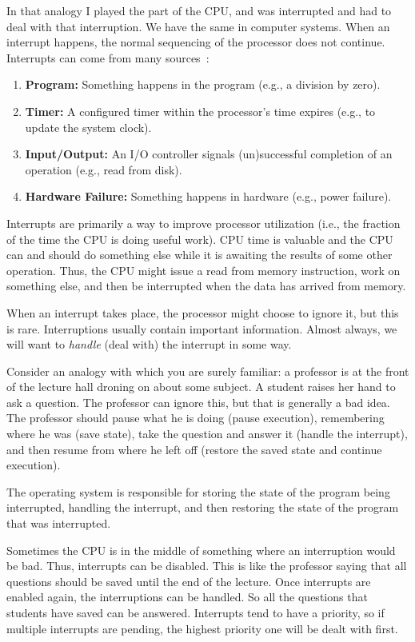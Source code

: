 In that analogy I played the part of the CPU, and was interrupted and had to deal with that interruption. We have the same in computer systems. When an interrupt happens, the normal sequencing of the processor does not continue. Interrupts can come from many sources~\cite{osi}:

\begin{enumerate}
	\item \textbf{Program:} Something happens in the program (e.g., a division by zero).
	\item \textbf{Timer:} A configured timer within the processor's time expires (e.g., to update the system clock).
	\item \textbf{Input/Output:} An I/O controller signals (un)successful completion of an operation (e.g., read from disk).
	\item \textbf{Hardware Failure:} Something happens in hardware (e.g., power failure).
\end{enumerate}

Interrupts are primarily a way to improve processor utilization (i.e., the fraction of the time the CPU is doing useful work). CPU time is valuable and the CPU can and should do something else while it is awaiting the results of some other operation. Thus, the CPU might issue a read from memory instruction, work on something else, and then be interrupted when the data has arrived from memory.

When an interrupt takes place, the processor might choose to ignore it, but this is rare. Interruptions usually contain important information. Almost always, we will want to \textit{handle} (deal with) the interrupt in some way.

Consider an analogy with which you are surely familiar: a professor is at the front of the lecture hall droning on about some subject. A student raises her hand to ask a question. The professor can ignore this, but that is generally a bad idea. The professor should pause what he is doing (pause execution), remembering where he was (save state), take the question and answer it (handle the interrupt), and then resume from where he left off (restore the saved state and continue execution).

The operating system is responsible for storing the state of the program being interrupted, handling the interrupt, and then restoring the state of the program that was interrupted.

Sometimes the CPU is in the middle of something where an interruption would be bad. Thus, interrupts can be disabled. This is like the professor saying that all questions should be saved until the end of the lecture. Once interrupts are enabled again, the interruptions can be handled. So all the questions that students have saved can be answered. Interrupts tend to have a priority, so if multiple interrupts are pending, the highest priority one will be dealt with first.

